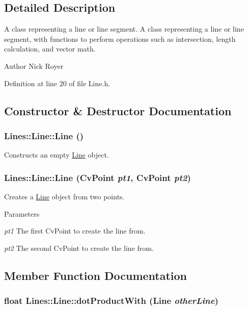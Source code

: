 \subsection{Detailed Description}
A class representing a line or line segment. A class representing a line or line segment, with functions to perform operations such as intersection, length calculation, and vector math. \begin{DoxyAuthor}{Author}
Nick Royer 
\end{DoxyAuthor}


Definition at line 20 of file Line.h.



\subsection{Constructor \& Destructor Documentation}
\hypertarget{classLines_1_1Line_ad5d90c9b5c2c429b0836c17ff8adcead}{
\subsubsection[{Line}]{\setlength{\rightskip}{0pt plus 5cm}Lines::Line::Line ()}}
\label{classLines_1_1Line_ad5d90c9b5c2c429b0836c17ff8adcead}


Constructs an empty \hyperlink{classLines_1_1Line}{Line} object. 

\hypertarget{classLines_1_1Line_adfb91debbc6f85acaa956f03a6ba7181}{
\subsubsection[{Line}]{\setlength{\rightskip}{0pt plus 5cm}Lines::Line::Line (CvPoint {\em pt1}, \/  CvPoint {\em pt2})}}
\label{classLines_1_1Line_adfb91debbc6f85acaa956f03a6ba7181}


Creates a \hyperlink{classLines_1_1Line}{Line} object from two points. 


\begin{DoxyParams}{Parameters}
\item[{\em pt1}]The first CvPoint to create the line from. \item[{\em pt2}]The second CvPoint to create the line from. \end{DoxyParams}


\subsection{Member Function Documentation}
\hypertarget{classLines_1_1Line_ae98d61a9e9c87d7885718199a3f3ebb1}{
\subsubsection[{dotProductWith}]{\setlength{\rightskip}{0pt plus 5cm}float Lines::Line::dotProductWith ({\bf Line} {\em otherLine})}}
\label{classLines_1_1Line_ae98d61a9e9c87d7885718199a3f3ebb1}


